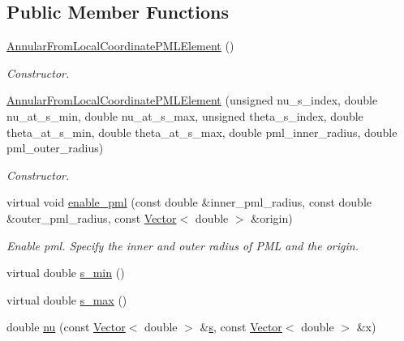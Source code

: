 \subsection*{Public Member Functions}
\begin{DoxyCompactItemize}
\item 
\hyperlink{classoomph_1_1AnnularFromLocalCoordinatePMLElement_a3e7cb53dd208524cb5378d1ec2ee1e89}{Annular\+From\+Local\+Coordinate\+P\+M\+L\+Element} ()
\begin{DoxyCompactList}\small\item\em Constructor. \end{DoxyCompactList}\item 
\hyperlink{classoomph_1_1AnnularFromLocalCoordinatePMLElement_a32ef4115b2cce33d4ec93a5620807685}{Annular\+From\+Local\+Coordinate\+P\+M\+L\+Element} (unsigned nu\+\_\+s\+\_\+index, double nu\+\_\+at\+\_\+s\+\_\+min, double nu\+\_\+at\+\_\+s\+\_\+max, unsigned theta\+\_\+s\+\_\+index, double theta\+\_\+at\+\_\+s\+\_\+min, double theta\+\_\+at\+\_\+s\+\_\+max, double pml\+\_\+inner\+\_\+radius, double pml\+\_\+outer\+\_\+radius)
\begin{DoxyCompactList}\small\item\em Constructor. \end{DoxyCompactList}\item 
virtual void \hyperlink{classoomph_1_1AnnularFromLocalCoordinatePMLElement_a232008f72c0ee625d59b1e588c850dfe}{enable\+\_\+pml} (const double \&inner\+\_\+pml\+\_\+radius, const double \&outer\+\_\+pml\+\_\+radius, const \hyperlink{classoomph_1_1Vector}{Vector}$<$ double $>$ \&origin)
\begin{DoxyCompactList}\small\item\em Enable pml. Specify the inner and outer radius of P\+ML and the origin. \end{DoxyCompactList}\item 
virtual double \hyperlink{classoomph_1_1AnnularFromLocalCoordinatePMLElement_a7d0f2e25ee965d08b067c5a0a8d3bef2}{s\+\_\+min} ()
\item 
virtual double \hyperlink{classoomph_1_1AnnularFromLocalCoordinatePMLElement_ab4e7e9103ffc587755a6149db1559688}{s\+\_\+max} ()
\item 
double \hyperlink{classoomph_1_1AnnularFromLocalCoordinatePMLElement_a161e427b6f1fc6349b9667caf346cf8a}{nu} (const \hyperlink{classoomph_1_1Vector}{Vector}$<$ double $>$ \&\hyperlink{cfortran_8h_ab7123126e4885ef647dd9c6e3807a21c}{s}, const \hyperlink{classoomph_1_1Vector}{Vector}$<$ double $>$ \&x)

\end{DoxyCompactItemize}
